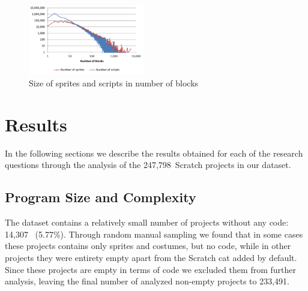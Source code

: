 \documentclass{sig-alternate}
\newcommand{\nAnalyzedPrograms}{247,798}
\newcommand{\nemptyPrograms}{14,307}
\newcommand{\nScriptPrograms}{233,491}
\begin{document}
\begin{figure}
	\centering
	\includegraphics[width=0.45\textwidth]{fig/charts/13longmethod}
	\caption{Size of sprites and scripts in number of blocks}
	\label{fig:longmethod}
\end{figure}

\section{Results}
\label{sec:results}
In the following sections we describe the results obtained for each of the research questions through the analysis of the \nAnalyzedPrograms~Scratch projects in our dataset.

\subsection{Program Size and Complexity}
\label{RQ1}
The dataset contains a relatively small number of projects without any code: \nemptyPrograms~ (5.77\%). Through random manual sampling we found that in some cases these projects contains only sprites and costumes, but no code, while in other projects they were entirety empty apart from the Scratch cat added by default. Since these projects are empty in terms of code we excluded them from further analysis, leaving the final number of analyzed non-empty projects to \nScriptPrograms.
\end{document}
